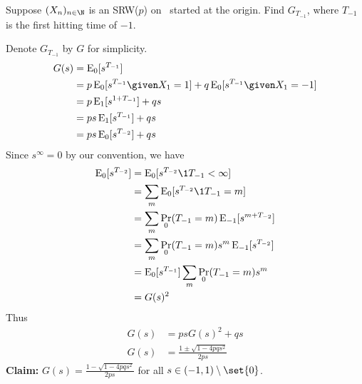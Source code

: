 \begin{exercise*}
    Suppose $(X_n)_{n \in \N}$ is an SRW($p$) on \Z\ started at the origin.
    Find $G_{T_{-1}}$,
    where $T_{-1}$ is the first hitting time of $-1$.
\end{exercise*}
\begin{solution}
    Denote $G_{T_{-1}}$ by $G$ for simplicity.
    \begin{align*}
        G(s) &= \E_0[s^{T_{-1}}] \\
            &= p \E_0[s^{T_{-1}} \given X_1 = 1]
                + q \E_0[s^{T_{-1}} \given X_1 = -1] \\
            &= p \E_1[s^{1 + T_{-1}}] + q s \\
            &= p s \E_1[s^{T_{-1}}] + q s \\
            &= p s \E_0[s^{T_{-2}}] + q s
    \end{align*}
    Since $s^\infty = 0$ by our convention, we have \begin{align*}
        \E_0[s^{T_{-2}}] &= \E_0[s^{T_{-2}} \1{T_{-1} < \infty}] \\
            &= \sum_{m} \E_0[s^{T_{-2}} \1{T_{-1} = m}] \\
            &= \sum_{m} \Pr_0(T_{-1} = m) \E_{-1}[s^{m + T_{-2}}] \\
            &= \sum_{m} \Pr_0(T_{-1} = m) s^m \E_{-1}[s^{T_{-2}}] \\
            &= \E_0[s^{T_{-1}}] \sum_{m} \Pr_0(T_{-1} = m) s^m \\
            &= G(s)^2
    \end{align*}
    Thus \begin{align*}
        G(s) &= p s G(s)^2 + q s \\
        G(s) &= \frac{1 \pm \sqrt{1 - 4pq s^2}}{2ps}
    \end{align*}
    \textbf{Claim:} $G(s) = \frac{1 - \sqrt{1 - 4pqs^2}}{2ps}$ for all
    $s \in (-1, 1) \setminus \set{0}$.
\end{solution}
